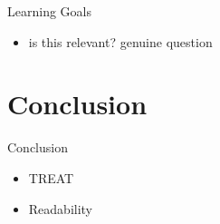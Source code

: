 \begin{frame}{Learning Goals}
    \begin{itemize}
        \item is this relevant? genuine question
    \end{itemize}
\end{frame}
\section{Conclusion}
\begin{frame}{Conclusion}
    \begin{itemize}
        \item TREAT
        \item Readability
    \end{itemize}
\end{frame}